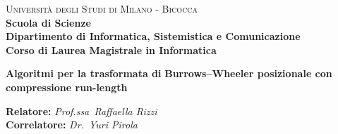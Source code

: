 \documentclass[a4paper,12pt, oneside]{book}
\begin{document}
{} 
\begin{titlepage}
  

  \noindent
  \begin{minipage}[t]{0.19\textwidth}
  \end{minipage}
  \begin{minipage}[t]{0.81\textwidth}
    {
      {\textsc{Università degli Studi di Milano - Bicocca}} \\
      \textbf{Scuola di Scienze} \\
      \textbf{Dipartimento di Informatica, Sistemistica e Comunicazione} \\
      \textbf{Corso di Laurea Magistrale in Informatica} \\
      \par
    }
  \end{minipage}
  
  \vspace{40mm}
  
  \begin{center}
    {\LARGE{
        \textbf{Algoritmi per la trasformata di\vspace{1mm}}}}
    \vspace{1mm}
    {\LARGE{
        \textbf{Burrows--Wheeler posizionale con}}}
    \vspace{1mm}
    {\LARGE{
        \textbf{compressione run-length}}}
    
  \end{center}
  
  \vspace{43mm}

  \noindent
  {\large \textbf{Relatore:} \textit{Prof.ssa~Raffaella Rizzi}} \\

  \noindent
  {\large \textbf{Correlatore:} \textit{Dr.~Yuri Pirola}}
  

\end{titlepage}
\end{document}

